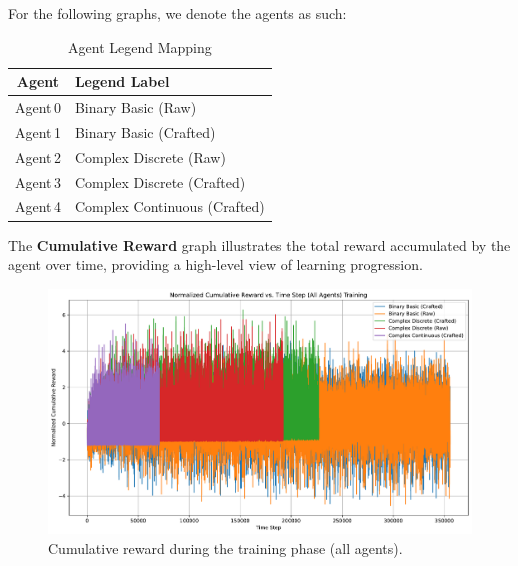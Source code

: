 \documentclass[sigconf]{acmart}
\begin{document}
\bigskip

For the following graphs, we denote the agents as such:

\begin{table}[h]
  \centering
  \caption{Agent Legend Mapping}
  \begin{tabular}{cl}
    \toprule
    \textbf{Agent} & \textbf{Legend Label} \\
    \midrule
    Agent\,0 & Binary Basic (Raw) \\
    Agent\,1 & Binary Basic (Crafted) \\
    Agent\,2 & Complex Discrete (Raw) \\
    Agent\,3 & Complex Discrete (Crafted) \\
    Agent\,4 & Complex Continuous (Crafted) \\
    \bottomrule
  \end{tabular}
\end{table}

\bigskip

\bigskip

The \textbf{Cumulative Reward} graph illustrates the total reward accumulated by the agent over time, providing a high-level view of learning progression.

\begin{figure}[t]
  \centering
  \includegraphics[width=\textwidth]{cumulative_reward_all_training.pdf}
  \caption{Cumulative reward during the training phase (all agents).}
  \label{fig:cumulative_reward_all_training}
\end{figure}

\bigskip
\end{document}
